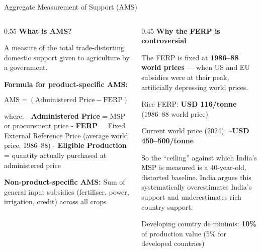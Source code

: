 \documentclass[
  ignorenonframetext,
  aspectratio=169,
]{beamer}
\makeatletter
\let\quarto@originallabel\label
\DeclareRobustCommand*{\label}[1]{\quarto@originallabel{#1}}
\makeatother
\begin{document}
\begin{frame}{Aggregate Measurement of Support (AMS)}
\label{aggregate-measurement-of-support-ams}
\begin{columns}[T]
\begin{column}{0.55\linewidth}
\textbf{What is AMS?}

A measure of the total trade-distorting domestic support given to
agriculture by a government.

\textbf{Formula for product-specific AMS:}

\[\text{AMS} = (\text{Administered Price} - \text{FERP}) \times \text{Eligible Production}\]

where: - \textbf{Administered Price} = MSP or procurement price -
\textbf{FERP} = Fixed External Reference Price (average world price,
1986--88) - \textbf{Eligible Production} = quantity actually purchased
at administered price

\textbf{Non-product-specific AMS:} Sum of general input subsidies
(fertiliser, power, irrigation, credit) across all crops
\end{column}

\begin{column}{0.45\linewidth}
\textbf{Why the FERP is controversial}

The FERP is fixed at \textbf{1986--88 world prices} --- when US and EU
subsidies were at their peak, artificially depressing world prices.

Rice FERP: \textbf{USD 116/tonne} (1986--88 world price)

Current world price (2024): \textasciitilde{}\textbf{USD 450--500/tonne}

So the ``ceiling'' against which India's MSP is measured is a
40-year-old, distorted baseline. India argues this systematically
overestimates India's support and underestimates rich country support.

Developing country de minimis: \textbf{10\%} of production value (5\%
for developed countries)
\end{column}
\end{columns}
\end{frame}
\end{document}
